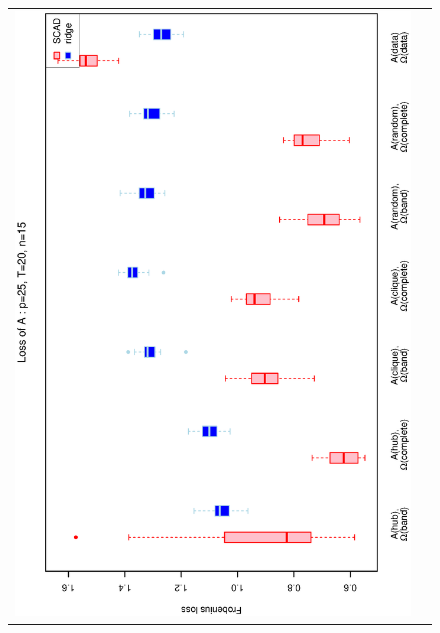 \documentclass[a4paper]{article}
\begin{document}
\begin{figure}[h!]
\centering
\begin{tabular}{cc}
\includegraphics[scale=0.45,angle=270]{LossA25T20N15_5.eps}
\\

\end{tabular}
\end{figure}
\end{document}
